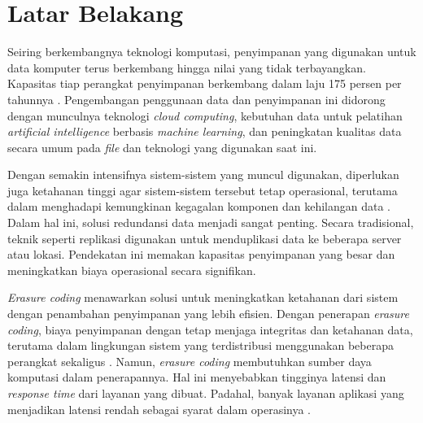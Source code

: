 \section{Latar Belakang}
\label{sec:latar-belakang}

Seiring berkembangnya teknologi komputasi, penyimpanan yang digunakan untuk data komputer terus berkembang hingga nilai yang tidak terbayangkan. Kapasitas tiap perangkat penyimpanan berkembang dalam laju 175 persen per tahunnya \parencite{kelechava2016storage}. Pengembangan penggunaan data dan penyimpanan ini didorong dengan munculnya teknologi \textit{cloud computing}, kebutuhan data untuk pelatihan \textit{artificial intelligence} berbasis \textit{machine learning}, dan peningkatan kualitas data secara umum pada \textit{file} dan teknologi yang digunakan saat ini.


Dengan semakin intensifnya sistem-sistem yang muncul digunakan, diperlukan juga ketahanan tinggi agar sistem-sistem tersebut tetap operasional, terutama dalam menghadapi kemungkinan kegagalan komponen dan kehilangan data \parencite{weatherspoon2002erasure}. Dalam hal ini, solusi redundansi data menjadi sangat penting. Secara tradisional, teknik seperti replikasi digunakan untuk menduplikasi data ke beberapa server atau lokasi. Pendekatan ini memakan kapasitas penyimpanan yang besar dan meningkatkan biaya operasional secara signifikan.

\textit{Erasure coding} menawarkan solusi untuk meningkatkan ketahanan dari sistem dengan penambahan penyimpanan yang lebih efisien. Dengan penerapan \textit{erasure coding}, biaya penyimpanan dengan tetap menjaga integritas dan ketahanan data, terutama dalam lingkungan sistem yang terdistribusi menggunakan beberapa perangkat sekaligus \parencite{balaji2018erasure}. Namun, \textit{erasure coding} membutuhkan sumber daya komputasi dalam penerapannya. Hal ini menyebabkan tingginya latensi dan \textit{response time} dari layanan yang dibuat. Padahal, banyak layanan aplikasi yang menjadikan latensi rendah sebagai syarat dalam operasinya \parencite{dean2013tail}.


